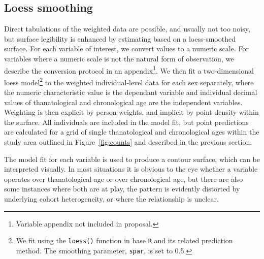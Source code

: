 \documentclass{article}
\begin{document}
\subsection{Loess smoothing}
Direct tabulations of the weighted data are possible, and usually not too noisy,
but surface legibility is enhanced by estimating based on a loess-smoothed
surface. For each variable of interest, we convert values to a numeric scale.
For variables where a numeric scale is not the natural form of observation, we
describe the conversion protocol in an appendix\footnote{Variable appendix not
included in proposal.}. We then fit a two-dimensional loess model\footnote{We
fit using the \texttt{loess()} function in base \texttt{R}
\citep{cleveland1992local,Rcore2013} and its related prediction method. The
smoothing parameter, \texttt{spar}, is set to 0.5.} to the weighted
individual-level data for each sex separately, where the numeric characteristic value is the dependant variable and individual decimal values of thanatological and chronological age are the independent variables.
Weighting is then explicit by person-weights, and implicit by point density
within the surface. All individuals are included in the model fit, but point
predictions are calculated for a grid of single thanatological and chronological
ages within the study area outlined in Figure~\ref{fig:counts} and described in
the previous section. 

The model fit for each variable is used to produce a contour surface, which can
be interpreted visually. In most situations it is obvious to the eye whether a
variable operates over thanatological age or over chronological age, but there
are also some instances where both are at play, the pattern is evidently
distorted by underlying cohort heterogeneity, or where the relationship is
unclear.






   
  
\end{document}
